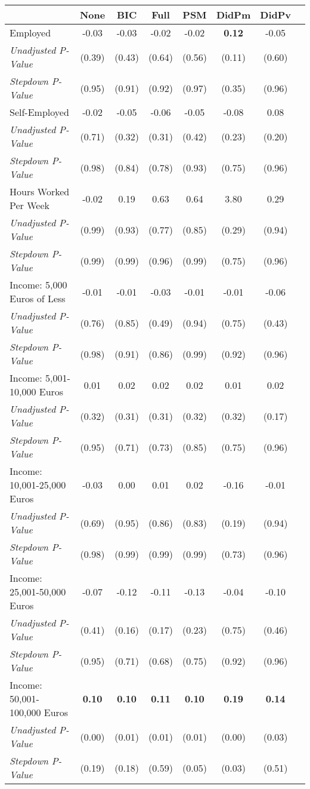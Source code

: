 \begin{tabular}{l c c c c c c c}
\toprule
 & None & BIC & Full & PSM & DidPm & DidPv \\
\midrule
Employed & -0.03 & -0.03 & -0.02 & -0.02 & \textbf{ 0.12 } & -0.05 \\
\quad \textit{Unadjusted P-Value} & (0.39) & (0.43) & (0.64) & (0.56) & (0.11) & (0.60) \\
\quad \textit{Stepdown P-Value} & (0.95) & (0.91) & (0.92) & (0.97) & (0.35) & (0.96) \\
Self-Employed & -0.02 & -0.05 & -0.06 & -0.05 & -0.08 & 0.08 \\
\quad \textit{Unadjusted P-Value} & (0.71) & (0.32) & (0.31) & (0.42) & (0.23) & (0.20) \\
\quad \textit{Stepdown P-Value} & (0.98) & (0.84) & (0.78) & (0.93) & (0.75) & (0.96) \\
Hours Worked Per Week & -0.02 & 0.19 & 0.63 & 0.64 & 3.80 & 0.29 \\
\quad \textit{Unadjusted P-Value} & (0.99) & (0.93) & (0.77) & (0.85) & (0.29) & (0.94) \\
\quad \textit{Stepdown P-Value} & (0.99) & (0.99) & (0.96) & (0.99) & (0.75) & (0.96) \\
Income: 5,000 Euros of Less & -0.01 & -0.01 & -0.03 & -0.01 & -0.01 & -0.06 \\
\quad \textit{Unadjusted P-Value} & (0.76) & (0.85) & (0.49) & (0.94) & (0.75) & (0.43) \\
\quad \textit{Stepdown P-Value} & (0.98) & (0.91) & (0.86) & (0.99) & (0.92) & (0.96) \\
Income: 5,001-10,000 Euros & 0.01 & 0.02 & 0.02 & 0.02 & 0.01 & 0.02 \\
\quad \textit{Unadjusted P-Value} & (0.32) & (0.31) & (0.31) & (0.32) & (0.32) & (0.17) \\
\quad \textit{Stepdown P-Value} & (0.95) & (0.71) & (0.73) & (0.85) & (0.75) & (0.96) \\
Income: 10,001-25,000 Euros & -0.03 & 0.00 & 0.01 & 0.02 & -0.16 & -0.01 \\
\quad \textit{Unadjusted P-Value} & (0.69) & (0.95) & (0.86) & (0.83) & (0.19) & (0.94) \\
\quad \textit{Stepdown P-Value} & (0.98) & (0.99) & (0.99) & (0.99) & (0.73) & (0.96) \\
Income: 25,001-50,000 Euros & -0.07 & -0.12 & -0.11 & -0.13 & -0.04 & -0.10 \\
\quad \textit{Unadjusted P-Value} & (0.41) & (0.16) & (0.17) & (0.23) & (0.75) & (0.46) \\
\quad \textit{Stepdown P-Value} & (0.95) & (0.71) & (0.68) & (0.75) & (0.92) & (0.96) \\
Income: 50,001-100,000 Euros & \textbf{ 0.10 } & \textbf{ 0.10 } & \textbf{ 0.11 } & \textbf{ 0.10 } & \textbf{ 0.19 } & \textbf{ 0.14 } \\
\quad \textit{Unadjusted P-Value} & (0.00) & (0.01) & (0.01) & (0.01) & (0.00) & (0.03) \\
\quad \textit{Stepdown P-Value} & (0.19) & (0.18) & (0.59) & (0.05) & (0.03) & (0.51) \\
\bottomrule
\end{tabular}
